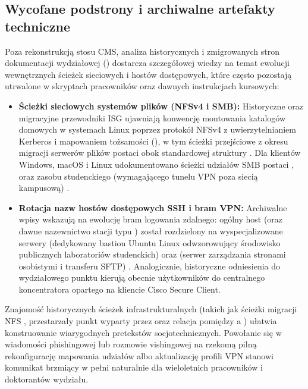 {{\subsection{Wycofane podstrony i archiwalne artefakty techniczne}\label{subsec:wycofane-zasoby}

Poza rekonstrukcją stosu CMS, analiza historycznych i zmigrowanych stron dokumentacji wydziałowej () dostarcza szczegółowej wiedzy na temat ewolucji wewnętrznych ścieżek sieciowych i hostów dostępowych, które często pozostają utrwalone w skryptach pracowników oraz dawnych instrukcjach kursowych:
\begin{itemize}
    \item \textbf{Ścieżki sieciowych systemów plików (NFSv4 i SMB):} Historyczne oraz migracyjne przewodniki ISG ujawniają konwencję montowania katalogów domowych w systemach Linux poprzez protokół NFSv4 z uwierzytelnianiem Kerberos i mapowaniem tożsamości (), w tym ścieżki przejściowe z okresu migracji serwerów plików postaci  obok standardowej struktury . Dla klientów Windows, macOS i Linux udokumentowano ścieżki udziałów SMB postaci ,  oraz zasobu studenckiego  (wymagającego tunelu VPN poza siecią kampusową) \cite{isg_dinfk_wiki}.
    \item \textbf{Rotacja nazw hostów dostępowych SSH i bram VPN:} Archiwalne wpisy wskazują na ewolucję bram logowania zdalnego: ogólny host  (oraz dawne nazewnictwo stacji typu ) został rozdzielony na wyspecjalizowane serwery  (dedykowany bastion Ubuntu Linux odwzorowujący środowisko publicznych laboratoriów studenckich) oraz  (serwer zarządzania stronami osobistymi i transferu SFTP) \cite{isg_dinfk_wiki}. Analogicznie, historyczne odniesienia do wydziałowego punktu  kierują obecnie użytkowników do centralnego koncentratora  opartego na kliencie Cisco Secure Client.
\end{itemize}

Znajomość historycznych ścieżek infrastrukturalnych (takich jak ścieżki migracji NFS , przestarzały punkt  wyparty przez  oraz relacja pomiędzy  a ) ułatwia konstruowanie wiarygodnych pretekstów socjotechnicznych. Powołanie się w wiadomości phishingowej lub rozmowie vishingowej na rzekomą pilną rekonfigurację mapowania udziałów  albo aktualizację profili VPN stanowi komunikat brzmiący w pełni naturalnie dla wieloletnich pracowników i doktorantów wydziału.

}}
